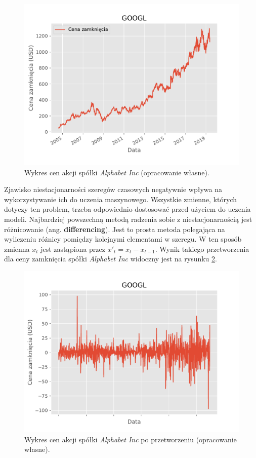 \documentclass[a4paper, twoside, 11pt, openright]{article}
\begin{document}
\begin{figure}[H]
\centering 
\includegraphics[scale=0.9]{img/GOOGL_adj_close.pdf}
\caption{Wykres cen akcji spółki \textit{Alphabet Inc} (opracowanie własne).}
\label{img:non_stationary_adjusted_close}
\end{figure}

Zjawisko niestacjonarności szeregów czasowych negatywnie wpływa na wykorzystywanie ich do uczenia maszynowego. Wszystkie zmienne, których dotyczy ten problem, trzeba odpowiednio dostosować przed użyciem do uczenia modeli. Najbardziej powszechną metodą radzenia sobie z niestacjonarnością jest różnicowanie (ang. \textbf{differencing}). Jest to prosta metoda polegająca na wyliczeniu różnicy pomiędzy kolejnymi elementami w szeregu. W ten sposób zmienna $x_t$ jest zastąpiona przez $x'_t=x_t-x_{t-1}$. Wynik takiego przetworzenia dla ceny zamknięcia spółki \textit{Alphabet Inc} widoczny jest na rysunku \ref{img:stationary_adjusted_close}.


\begin{figure}[H]
\centering 
\includegraphics[scale=0.9]{img/adjusted_close_stationary.pdf}
\caption{Wykres cen akcji spółki \textit{Alphabet Inc} po przetworzeniu (opracowanie własne).}
\label{img:stationary_adjusted_close}
\end{figure}
\end{document}
